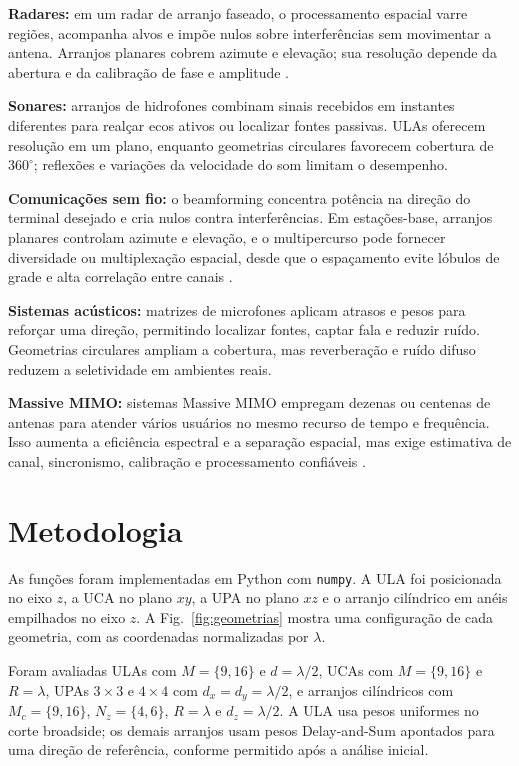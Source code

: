 \documentclass[conference]{IEEEtran}
\begin{document}
\textbf{Radares:} em um radar de arranjo faseado, o processamento espacial
varre regiões, acompanha alvos e impõe nulos sobre interferências sem movimentar
a antena. Arranjos planares cobrem azimute e elevação; sua resolução depende da
abertura e da calibração de fase e amplitude \cite{balanis,matlab_radar}.

\textbf{Sonares:} arranjos de hidrofones combinam sinais recebidos em instantes
diferentes para realçar ecos ativos ou localizar fontes passivas. ULAs oferecem
resolução em um plano, enquanto geometrias circulares favorecem cobertura de
$360^\circ$; reflexões e variações da velocidade do som limitam o desempenho.

\textbf{Comunicações sem fio:} o beamforming concentra potência na direção do
terminal desejado e cria nulos contra interferências. Em estações-base,
arranjos planares controlam azimute e elevação, e o multipercurso pode fornecer
diversidade ou multiplexação espacial, desde que o espaçamento evite lóbulos de
grade e alta correlação entre canais \cite{tse,matlab_multichannel}.

\textbf{Sistemas acústicos:} matrizes de microfones aplicam atrasos e pesos para
reforçar uma direção, permitindo localizar fontes, captar fala e reduzir ruído.
Geometrias circulares ampliam a cobertura, mas reverberação e ruído difuso
reduzem a seletividade em ambientes reais.

\textbf{Massive MIMO:} sistemas Massive MIMO empregam dezenas ou centenas de
antenas para atender vários usuários no mesmo recurso de tempo e frequência.
Isso aumenta a eficiência espectral e a separação espacial, mas exige estimativa
de canal, sincronismo, calibração e processamento confiáveis
\cite{tse,mpirical_mimo}.
\FloatBarrier

\section{Metodologia}
As funções foram implementadas em Python com \texttt{numpy}. A ULA foi
posicionada no eixo $z$, a UCA no plano $xy$, a UPA no plano $xz$ e o arranjo
cilíndrico em anéis empilhados no eixo $z$. A Fig.~\ref{fig:geometrias} mostra
uma configuração de cada geometria, com as coordenadas normalizadas por
$\lambda$.

Foram avaliadas ULAs com $M=\{9,16\}$ e $d=\lambda/2$, UCAs com
$M=\{9,16\}$ e $R=\lambda$, UPAs $3\times3$ e $4\times4$ com
$d_x=d_y=\lambda/2$, e arranjos cilíndricos com $M_c=\{9,16\}$,
$N_z=\{4,6\}$, $R=\lambda$ e $d_z=\lambda/2$. A ULA usa pesos uniformes no
corte broadside; os demais arranjos usam pesos Delay-and-Sum apontados para uma
direção de referência, conforme permitido após a análise inicial.
\end{document}
